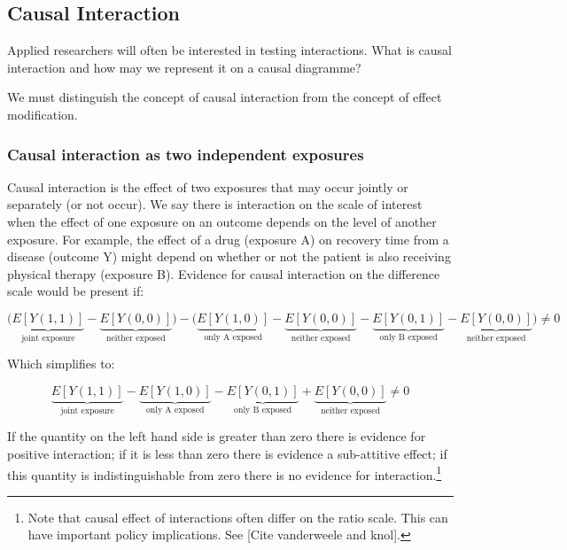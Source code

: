 \documentclass[
  singlecolumn]{report}
\begin{document}
\hypertarget{causal-interaction}{%
\subsection{Causal Interaction}\label{causal-interaction}}

Applied researchers will often be interested in testing interactions.
What is causal interaction and how may we represent it on a causal
diagramme?

We must distinguish the concept of causal interaction from the concept
of effect modification.

\hypertarget{causal-interaction-as-two-independent-exposures}{%
\subsubsection{\texorpdfstring{\textbf{Causal interaction as two
independent
exposures}}{Causal interaction as two independent exposures}}\label{causal-interaction-as-two-independent-exposures}}

Causal interaction is the effect of two exposures that may occur jointly
or separately (or not occur). We say there is interaction on the scale
of interest when the effect of one exposure on an outcome depends on the
level of another exposure. For example, the effect of a drug (exposure
A) on recovery time from a disease (outcome Y) might depend on whether
or not the patient is also receiving physical therapy (exposure B).
Evidence for causal interaction on the difference scale would be present
if:

\[\bigg(\underbrace{E[Y(1,1)]}_{\text{joint exposure}} - \underbrace{E[Y(0,0)]}_{\text{neither exposed}}\bigg) - \bigg(\underbrace{E[Y(1,0)]}_{\text{only A exposed}} - \underbrace{E[Y(0,0)]}_{\text{neither exposed}}- \underbrace{E[Y(0,1)]}_{\text{only B exposed}} - \underbrace{E[Y(0,0)]}_{\text{neither exposed}} \bigg) \neq 0 \]

Which simplifies to:

\[ \underbrace{E[Y(1,1)]}_{\text{joint exposure}} - \underbrace{E[Y(1,0)]}_{\text{only A exposed}} - \underbrace{E[Y(0,1)]}_{\text{only B exposed}} + \underbrace{E[Y(0,0)]}_{\text{neither exposed}} \neq 0 \]

If the quantity on the left hand side is greater than zero there is
evidence for positive interaction; if it is less than zero there is
evidence a sub-attitive effect; if this quantity is indistinguishable
from zero there is no evidence for interaction.\footnote{Note that
  causal effect of interactions often differ on the ratio scale. This
  can have important policy implications. See {[}Cite vanderweele and
  knol{]}.}
\end{document}

